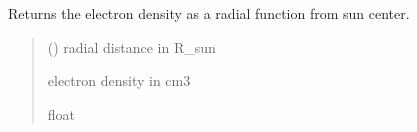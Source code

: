 \documentclass[letterpaper,10pt,english]{sphinxmanual}
\begin{document}
\begin{fulllineitems}
\label{\detokenize{doppler_dimming_lib:doppler_dimming_lib.utils.N_e_analytical}}
\pysigstartsignatures
{}
\pysigstopsignatures
\sphinxAtStartPar
Returns the electron density as a radial function from sun center.
\begin{quote}\begin{description}
\sphinxAtStartPar
{} () \textendash{} radial distance in R\_sun

\sphinxAtStartPar
electron density in cm\sphinxhyphen{}3

\sphinxAtStartPar
float

\end{description}\end{quote}

\end{fulllineitems}

\end{document}
